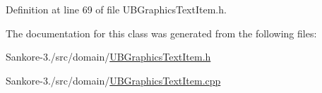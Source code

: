 Definition at line 69 of file U\-B\-Graphics\-Text\-Item.\-h.



The documentation for this class was generated from the following files\-:\begin{DoxyCompactItemize}
\item 
Sankore-\/3./src/domain/\hyperlink{_u_b_graphics_text_item_8h}{U\-B\-Graphics\-Text\-Item.\-h}\item 
Sankore-\/3./src/domain/\hyperlink{_u_b_graphics_text_item_8cpp}{U\-B\-Graphics\-Text\-Item.\-cpp}\end{DoxyCompactItemize}
